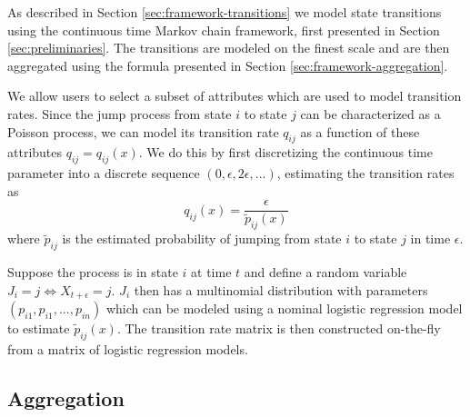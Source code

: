 As described in Section \ref{sec:framework-transitions} we model state transitions using the continuous
time Markov chain framework, first presented in Section \ref{sec:preliminaries}. The transitions are 
modeled on the finest scale and are then aggregated using the formula presented in Section \ref{sec:framework-aggregation}.

We allow users to select a subset of attributes which are used to model transition rates. Since the
jump process from state $i$ to state $j$ can be characterized as a Poisson process, we can model its
transition rate $q_{ij}$ as a function of these attributes $q_{ij} = q_{ij}(x)$. We do this by first
discretizing the continuous time parameter into a discrete sequence $(0, \epsilon, 2\epsilon, ...)$,
estimating the transition rates as
\begin{equation}
	q_{ij}(x) = \frac{\epsilon}{\tilde{p}_{ij}(x)}
\end{equation}
where $\tilde{p}_{ij}$ is the estimated probability of jumping from state $i$ to state $j$ in time
$\epsilon$.

Suppose the process is in state $i$ at time $t$ and define a random variable $J_i = j \Leftrightarrow X_{t + \epsilon} = j$.
$J_i$ then has a multinomial distribution with parameters $(p_{i1}, p_{i1}, ..., p_{in})$ which can be 
modeled using a nominal logistic regression model \cite{glm-introduction} to estimate $\tilde{p}_{ij}(x)$.
The transition rate matrix is then constructed on-the-fly from a matrix of logistic regression models.


\subsection{Aggregation}
\label{sec:state-aggregation-impl}

